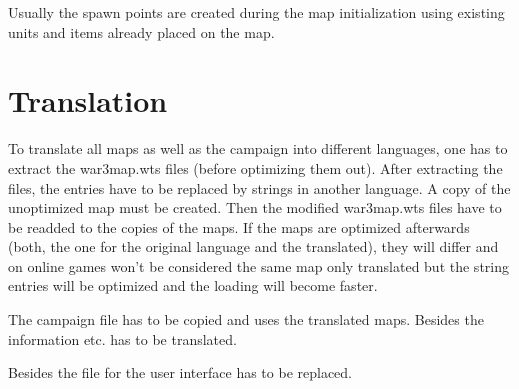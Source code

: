\documentclass[a4paper,12pt,titlepage]{report}
\begin{document}
Usually the spawn points are created during the map initialization using existing units and items already placed on the map.

\newpage

\chapter{Translation}

To translate all maps as well as the campaign into different languages, one has to extract the war3map.wts files (before optimizing them out). After extracting the files, the entries have to be replaced by strings in another language. A copy of the unoptimized map must be created. Then the modified war3map.wts files have to be readded to the copies of the maps. If the maps are optimized afterwards (both, the one for the original language and the translated), they will differ and on online games won't be considered the same map only translated but the string entries will be optimized and the loading will become faster.

\vspace{\baselineskip}

The campaign file has to be copied and uses the translated maps. Besides the information etc. has to be translated.

\vspace{\baselineskip}

Besides the file for the user interface has to be replaced.

\newpage

\cleardoublepage
{}
{}
\listoffigures

\newpage

%

\cleardoublepage
{}
{}
\renewcommand\lstlistingname{Listings}
\renewcommand\lstlistlistingname{Listings}
\lstlistoflistings

\newpage

\setcounter{biburlnumpenalty}{9000}
\setcounter{biburlucpenalty}{9000}
\setcounter{biburllcpenalty}{9000}
\cleardoublepage
{}
{}
\printbibliography[title=Bibliography]
\end{document}

